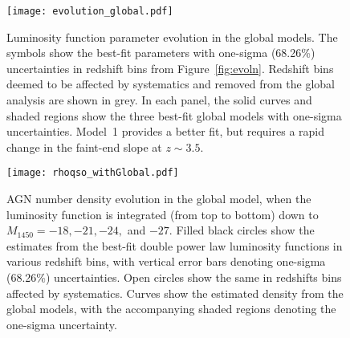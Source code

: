 \documentclass[fleqn,usenatbib]{mnras}
\begin{document}
\begin{figure*}
  \begin{center}
    \texttt{[image: evolution\_global.pdf]}
  \end{center}
  \caption{Luminosity function parameter evolution in the global
    models.  The symbols show the best-fit parameters with one-sigma
    (68.26\%) uncertainties in redshift bins from
    Figure~\ref{fig:evoln}.  Redshift bins deemed to be affected by
    systematics and removed from the global analysis are shown in
    grey.  In each panel, the solid curves and shaded regions show the
    three best-fit global models with one-sigma uncertainties.
    Model~1 provides a better fit, but requires a rapid change in the
    faint-end slope at $z\sim 3.5$.}
  \label{fig:evoln_global}
\end{figure*}

\begin{figure}
  \begin{center}
    \texttt{[image: rhoqso\_withGlobal.pdf]}
  \end{center}
  \caption{AGN number density evolution in the global model, when the
    luminosity function is integrated (from top to bottom) down to
    $M_\mathrm{1450}=-18, -21, -24,$ and $-27$.  Filled black circles
    show the estimates from the best-fit double power law luminosity
    functions in various redshift bins, with vertical error bars
    denoting one-sigma (68.26\%) uncertainties.  Open circles show the
    same in redshifts bins affected by systematics.  Curves show the
    estimated density from the global models, with the accompanying
    shaded regions denoting the one-sigma uncertainty. }
  \label{fig:rhoqso}
\end{figure}
\end{document}
